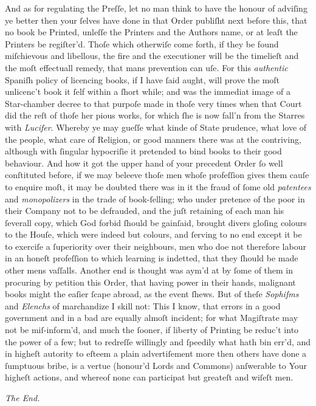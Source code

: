 And as for regulating the Preſſe, let no man think to have the honour of
adviſing ye better then your ſelves have done in that Order publiſht next before
this, that no book be Printed, unleſſe the Printers and the Authors name, or at
leaſt the Printers be regiſter'd.  Thoſe which otherwiſe come forth, if they be
found miſchievous and libellous, the fire and the executioner will be the
timelieſt and the moſt effectuall remedy, that mans prevention can uſe.  For
this \textit{authentic} Spaniſh policy of licencing books, if I have ſaid aught,
will prove the moſt unlicenc't book it ſelf within a ſhort while; and was the
immediat image of a Star-chamber decree to that purpoſe made in thoſe very times
when that Court did the reſt of thoſe her pious works, for which ſhe is now
fall'n from the Starres with \textit{Lucifer}.  Whereby ye may gueſſe what kinde
of State prudence, what love of the people, what care of Religion, or good
manners there was at the contriving, although with ſingular hypocriſie it
pretended to bind books to their good behaviour.  And how it got the upper hand
of your precedent Order ſo well conſtituted before, if we may beleeve thoſe men
whoſe profeſſion gives them cauſe to enquire moſt, it may be doubted there was
in it the fraud of ſome old \textit{patentees} and \textit{monopolizers} in the
trade of book-ſelling; who under pretence of the poor in their Company not to be
defrauded, and the juſt retaining of each man his ſeverall copy, which God
forbid ſhould be gainſaid, brought divers gloſing colours to the Houſe, which
were indeed but colours, and ſerving to no end except it be to exerciſe a
ſuperiority over their neighbours, men who doe not therefore labour in an honeſt
profeſſion to which learning is indetted, that they ſhould be made other mens
vaſſalls.  Another end is thought was aym'd at by ſome of them in procuring by
petition this Order, that having power in their hands, malignant books might the
eaſier ſcape abroad, as the event ſhews.  But of theſe \textit{Sophiſms} and
\textit{Elenchs} of marchandize I skill not: This I know, that errors in a good
government and in a bad are equally almoſt incident; for what Magiſtrate may not
be miſ-inform'd, and much the ſooner, if liberty of Printing be reduc't into the
power of a few; but to redreſſe willingly and ſpeedily what hath bin err'd, and
in higheſt autority to eſteem a plain advertiſement more then others have done a
ſumptuous bribe, is a vertue (honour'd Lords and Commons) anſwerable to Your
higheſt actions, and whereof none can participat but greateſt and wiſeſt men.

\vspace{0.5\baselineskip}

\begin{center}
    \Large\itshape
    The End.
\end{center}
